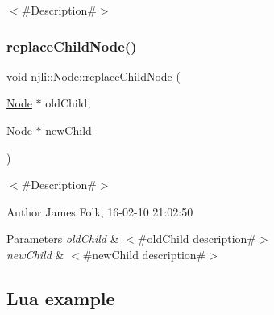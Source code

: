 $<$\#\+Description\#$>$ \mbox{\label{classnjli_1_1_node_a9cfbf971553e8c11548701deaa28a4a5}} 
\subsubsection{\texorpdfstring{replace\+Child\+Node()}{replaceChildNode()}}
{\footnotesize\ttfamily \mbox{\hyperlink{_thread_8h_af1e856da2e658414cb2456cb6f7ebc66}{void}} njli\+::\+Node\+::replace\+Child\+Node (\begin{DoxyParamCaption}\item[{\mbox{\hyperlink{classnjli_1_1_node}{Node}} $\ast$}]{old\+Child,  }\item[{\mbox{\hyperlink{classnjli_1_1_node}{Node}} $\ast$}]{new\+Child }\end{DoxyParamCaption})}



$<$\#\+Description\#$>$ 

\begin{DoxyAuthor}{Author}
James Folk, 16-\/02-\/10 21\+:02\+:50
\end{DoxyAuthor}

\begin{DoxyParams}{Parameters}
{\em old\+Child} & $<$\#old\+Child description\#$>$ \\
\hline
{\em new\+Child} & $<$\#new\+Child description\#$>$\\
\hline
\end{DoxyParams}
\hypertarget{classnjli_1_1_steering_behavior_wander_ex1}{}\subsection{Lua example}\label{classnjli_1_1_steering_behavior_wander_ex1}

\begin{DoxyCodeInclude}
\end{DoxyCodeInclude}
\mbox{\label{classnjli_1_1_node_a5674da852b950cc581fd22bc0c309b5f}} 
